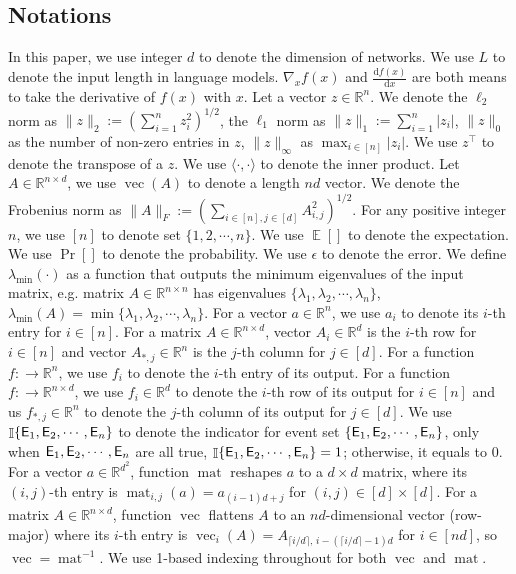 \documentclass[11pt]{article}
\theoremstyle{plain}
\newcommand{\R}{\mathbb{R}}
\renewcommand{\d}{\mathrm{d}}
\DeclareMathOperator*{\E}{{\mathbb{E}}}
\DeclareMathOperator{\I}{\mathbb{I}}
\DeclareMathOperator{\vect}{vec}
\DeclareMathOperator{\matr}{mat}
\begin{document}
\subsection{Notations}
In this paper, we use integer $d$ to denote the dimension of networks. We use $L$ to denote the input length in language models. $\nabla_x f(x)$ and $\frac{\d f(x)}{\d x}$ are both means to take the derivative of $f(x)$ with $x$. Let a vector $z\in\R^n$. We denote the $\ell_2$ norm as  $\|z\|_2:=( \sum_{i=1}^n z_i^2 )^{1/2}$, the $\ell_1$ norm as $\|z\|_1:=\sum_{i=1}^n |z_i| $, $\|z\|_0$ as the number of non-zero entries in $z$, $\| z \|_{\infty}$ as $\max_{i \in [n]} |z_i|$.  We use $z^\top$ to denote the transpose of a $z$. We use $\langle \cdot, \cdot \rangle$ to denote the inner product. Let $A \in \R^{n \times d}$, we use $\vect(A)$ to denote a length $nd$ vector. We denote the Frobenius norm as  $\|A\|_F:=( \sum_{i\in [n], j\in [d]} A_{i,j}^2 )^{1/2}$. For any positive integer $n$, we use $[n]$ to denote set $\{1,2,\cdots,n\}$. We use $\E[]$ to denote the expectation. We use $\Pr[]$ to denote the probability. We use $\epsilon$ to denote the error. We define $\lambda_{\min}(\cdot)$ as a function that outputs the minimum eigenvalues of the input matrix, e.g. matrix $A \in \R^{n \times n}$ has eigenvalues $\{ \lambda_1, \lambda_2, \cdots, \lambda_n \}$, $\lambda_{\min}(A) = \min \{ \lambda_1, \lambda_2, \cdots, \lambda_n \}$. For a vector $a \in \R^n$, we use $a_i$ to denote its $i$-th entry for $i \in [n]$. For a matrix $A \in \R^{n \times d}$, vector $A_i \in \R^d$ is the $i$-th row for $i \in [n]$ and vector $A_{*, j} \in \R^n$ is the $j$-th column for $j \in [d]$. For a function $f: \rightarrow \R^n$, we use $f_i$ to denote the $i$-th entry of its output. For a function $f: \rightarrow \R^{n \times d}$, we use $f_i \in \R^d$ to denote the $i$-th row of its output for $i \in [n]$ and us $f_{*, j} \in \R^n$ to denote the $j$-th column of its output for $j \in [d]$. We use $\I\{{\sf E}_1, {\sf E}_2, \cdots, {\sf E}_n\}$ to denote the indicator for event set $\{{\sf E}_1, {\sf E}_2, \cdots, {\sf E}_n\}$, only when ${\sf E}_1, {\sf E}_2, \cdots, {\sf E}_n$ are all true, $\I\{{\sf E}_1, {\sf E}_2, \cdots, {\sf E}_n\} = 1$; otherwise, it equals to $0$. For a vector $a \in \R^{d^2}$, function $\matr$ reshapes $a$ to a $d \times d$ matrix, where its $(i, j)$-th entry is $\matr_{i, j}(a) = a_{(i-1)d+j}$ for $(i, j) \in [d] \times [d]$. For a matrix $A \in \R^{n \times d}$, function $\vect$ flattens $A$ to an $nd$-dimensional vector (row-major) where its $i$-th entry is $\vect_i(A) = A_{\lceil i/d\rceil,\,i - (\lceil i/d\rceil - 1)d}$ for $i \in [nd]$, so $\vect = \matr^{-1}$. We use 1-based indexing throughout for both $\vect$ and $\matr$.
\end{document}
